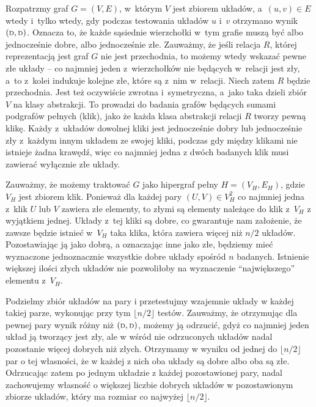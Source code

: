 Rozpatrzmy graf $G=(V,E)$, w~którym $V$ jest zbiorem układów, a~$(u,v)\in E$ wtedy i~tylko wtedy, gdy podczas testowania układów $u$ i~$v$ otrzymano wynik $({\scriptstyle\rm D},{\scriptstyle\rm D})$. Oznacza to, że każde sąsiednie wierzchołki w~tym grafie muszą być albo jednocześnie dobre, albo jednocześnie złe. Zauważmy, że jeśli relacja $R$, której reprezentacją jest graf $G$ nie jest przechodnia, to możemy wtedy wskazać pewne złe układy -- co najmniej jeden z~wierzchołków nie będących w~relacji jest zły, a~to z~kolei indukuje kolejne złe, które są z~nim w~relacji. Niech zatem $R$ będzie przechodnia. Jest też oczywiście zwrotna i~symetryczna, a~jako taka dzieli zbiór $V$ na klasy abstrakcji. To prowadzi do badania grafów będących sumami podgrafów pełnych (klik), jako że każda klasa abstrakcji relacji $R$ tworzy pewną klikę. Każdy z~układów dowolnej kliki jest jednocześnie dobry lub jednocześnie zły z~każdym innym układem ze swojej kliki, podczas gdy między klikami nie istnieje żadna krawędź, więc co najmniej jedna z dwóch badanych klik musi zawierać wyłącznie złe układy.

Zauważmy, że możemy traktować $G$ jako hipergraf pełny $H=(V_H,E_H)$, gdzie $V_H$ jest zbiorem klik. Ponieważ dla każdej pary $(U,V)\in V_H^2$ co najmniej jedna z~klik $U$ lub $V$ zawiera złe elementy, to złymi są elementy należące do klik z~$V_H$ z wyjątkiem jednej. Układy z~tej kliki są dobre, co gwarantuje nam założenie, że zawsze będzie istnieć w~$V_H$ taka klika, która zawiera więcej niż $n/2$ układów. Pozostawiając ją jako dobrą, a oznaczając inne jako złe, będziemy mieć wyznaczone jednoznacznie wszystkie dobre układy spośród $n$ badanych. Istnienie większej ilości złych układów nie pozwoliłoby na wyznaczenie ``największego'' elementu z~$V_H$.

\subproblem %
Podzielmy zbiór układów na pary i przetestujmy wzajemnie układy w każdej takiej parze, wykonując przy tym $\lfloor n/2\rfloor$ testów. Zauważmy, że otrzymując dla pewnej pary wynik różny niż $({\scriptstyle\rm D},{\scriptstyle\rm D})$, możemy ją odrzucić, gdyż co najmniej jeden układ ją tworzący jest zły, ale w wśród nie odrzuconych układów nadal pozostanie więcej dobrych niż złych. Otrzymamy w wyniku od jednej do $\lfloor n/2\rfloor$ par o tej własności, że w każdej z nich oba układy są dobre albo oba są złe. Odrzucając zatem po jednym układzie z każdej pozostawionej pary, nadal zachowujemy własność o większej liczbie dobrych układów w pozostawionym zbiorze układów, który ma rozmiar co najwyżej $\lfloor n/2\rfloor$.

